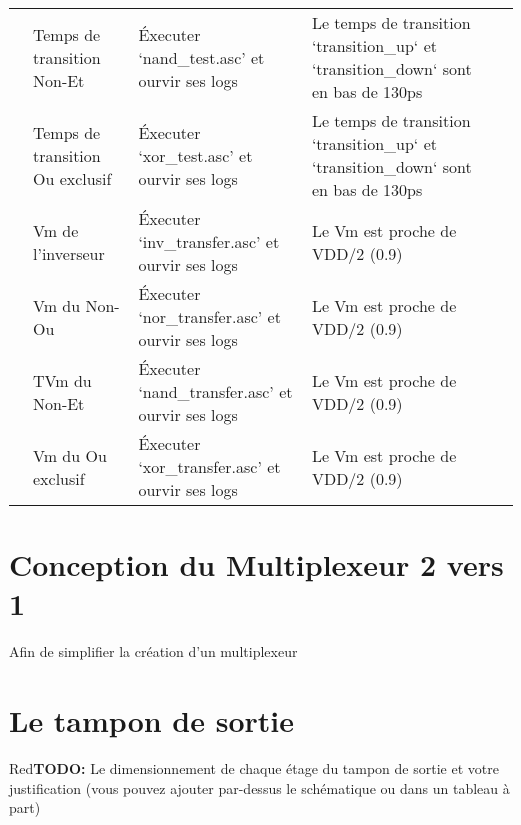 \documentclass[a11paper]{article}
\newcommand{\todo}[1]{\begin{color}{Red}\textbf{TODO:} #1\end{color}}
\newcommand{\cbox}{\fbox{\phantom{\ding{51}}}}
\newcounter{tid}
\newcommand{\tid}{\stepcounter{tid}\thetid}
\begin{document}
\begin{center}
\begin{longtable}{lp{5cm}p{4cm}p{4cm}l}
	  \tid &
    Temps de transition Non-Et &
		Éxecuter `nand_test.asc' et ourvir ses logs &
		Le temps de transition `transition_up` et `transition_down` sont en bas de 130ps &
		\cbox \\

	  \tid &
    Temps de transition Ou exclusif &
		Éxecuter `xor_test.asc' et ourvir ses logs &
		Le temps de transition `transition_up` et `transition_down` sont en bas de 130ps &
		\cbox \\


		\tid &
    Vm de l'inverseur &
		Éxecuter `inv_transfer.asc' et ourvir ses logs &
		Le Vm est proche de VDD/2 (0.9) &
		\cbox \\

		\tid &
    Vm du Non-Ou &
		Éxecuter `nor_transfer.asc' et ourvir ses logs &
		Le Vm est proche de VDD/2 (0.9) &
		\cbox \\

	  \tid &
    TVm du Non-Et &
		Éxecuter `nand_transfer.asc' et ourvir ses logs &
		Le Vm est proche de VDD/2 (0.9) &
		\cbox \\

	  \tid &
    Vm du Ou exclusif &
		Éxecuter `xor_transfer.asc' et ourvir ses logs &
		Le Vm est proche de VDD/2 (0.9) &
		\cbox \\

	\end{longtable}
\end{center}

\section{Conception du Multiplexeur 2 vers 1}

Afin de simplifier la création d'un multiplexeur

\section{Le tampon de sortie}
\todo{Le dimensionnement de chaque étage du tampon de sortie et votre justification (vous
pouvez ajouter par-dessus le schématique ou dans un tableau à part)}


\end{document}
